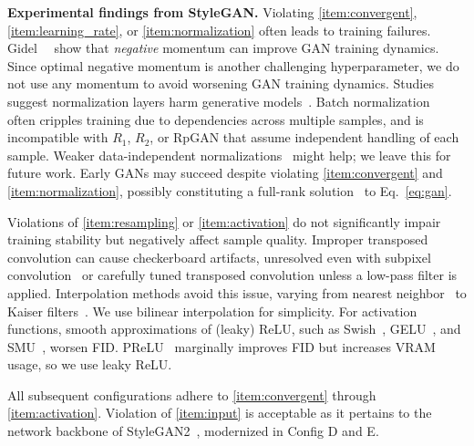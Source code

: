 \textbf{Experimental findings from StyleGAN.} Violating \ref{item:convergent}, \ref{item:learning_rate}, or \ref{item:normalization} often leads to training failures.
Gidel~\etal~\cite{ganmomentum} show that \emph{negative} momentum can improve GAN training dynamics. Since optimal negative momentum is another challenging hyperparameter, we do not use any momentum to avoid worsening GAN training dynamics. Studies suggest normalization layers harm generative models~\cite{sg2,edm2}. Batch normalization~\cite{bn} often cripples training due to dependencies across multiple samples, and is incompatible with $R_1$, $R_2$, or RpGAN that assume independent handling of each sample. Weaker data-independent normalizations~\cite{sg2,edm2} might help; we leave this for future work. Early GANs may succeed despite violating \ref{item:convergent} and \ref{item:normalization}, possibly constituting a full-rank solution~\cite{r1} to Eq.~\ref{eq:gan}.

Violations of \ref{item:resampling} or \ref{item:activation} do not significantly impair training stability but negatively affect sample quality. Improper transposed convolution can cause checkerboard artifacts, unresolved even with subpixel convolution~\cite{subpixel} or carefully tuned transposed convolution unless a low-pass filter is applied. Interpolation methods avoid this issue, varying from nearest neighbor~\cite{pggan} to Kaiser filters~\cite{sg3}. We use bilinear interpolation for simplicity. For activation functions, smooth approximations of (leaky) ReLU, such as Swish~\cite{swish}, GELU~\cite{gelu}, and SMU~\cite{smu}, worsen FID. PReLU~\cite{prelu} marginally improves FID but increases VRAM usage, so we use leaky ReLU.

All subsequent configurations adhere to \ref{item:convergent} through \ref{item:activation}. Violation of \ref{item:input} is acceptable as it pertains to the network backbone of StyleGAN2~\cite{sg2}, modernized in Config D and E.

